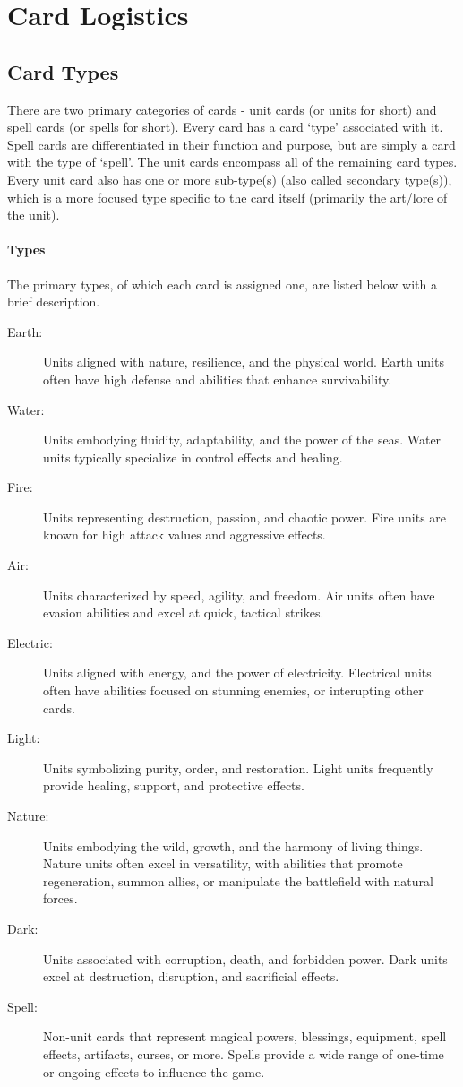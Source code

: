 \chapter{Card Logistics}





\section{Card Types}

There are two primary categories of cards - unit cards (or units for short) and spell cards (or spells for short). Every card has a card `type' associated with it. Spell cards are differentiated in their function and purpose, but are simply a card with the type of `spell'. The unit cards encompass all of the remaining card types. Every unit card also has one or more sub-type(s) (also called secondary type(s)), which is a more focused type specific to the card itself (primarily the art/lore of the unit).

\subsubsection{Types}
The primary types, of which each card is assigned one, are listed below with a brief description.
\begin{description}
	\item[Earth:] Units aligned with nature, resilience, and the physical world. Earth units often have high defense and abilities that enhance survivability.
	\item[Water:] Units embodying fluidity, adaptability, and the power of the seas. Water units typically specialize in control effects and healing.
	\item[Fire:] Units representing destruction, passion, and chaotic power. Fire units are known for high attack values and aggressive effects.
	\item[Air:] Units characterized by speed, agility, and freedom. Air units often have evasion abilities and excel at quick, tactical strikes.
	\item[Electric:] Units aligned with energy, and the power of electricity. Electrical units often have abilities focused on stunning enemies, or interupting other cards.
	\item[Light:] Units symbolizing purity, order, and restoration. Light units frequently provide healing, support, and protective effects.
	\item[Nature:] Units embodying the wild, growth, and the harmony of living things. Nature units often excel in versatility, with abilities that promote regeneration, summon allies, or manipulate the battlefield with natural forces.
	\item[Dark:] Units associated with corruption, death, and forbidden power. Dark units excel at destruction, disruption, and sacrificial effects.
	\item[Spell:] Non-unit cards that represent magical powers, blessings, equipment, spell effects, artifacts, curses, or more. Spells provide a wide range of one-time or ongoing effects to influence the game.
\end{description}

